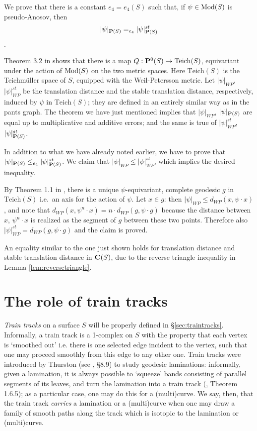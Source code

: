 \begin{rmk}\label{rmk:stable_dist_pc}
We prove that there is a constant $e_4=e_4(S)$ such that, if $\psi\in\mathrm{Mod}(S)$ is pseudo-Anosov, then
$$|\psi|_{\mathbf P(S)}=_{e_4} |\psi|_{\mathbf P(S)}^{st}$$.

Theorem 3.2 in \cite{brock1} shows that there is a map $Q:\mathbf P^0(S)\rightarrow \mathrm{Teich}(S)$, equivariant under the action of $\mathrm{Mod}(S)$ on the two metric spaces. Here $\mathrm{Teich}(S)$ is the Teichm\"uller space of $S$, equipped with the Weil-Petersson metric. Let $|\psi|_{WP}$, $|\psi|_{WP}^{st}$ be the translation distance and the stable translation distance, respectively, induced by $\psi$ in $\mathrm{Teich}(S)$; they are defined in an entirely similar way as in the pants graph. The theorem we have just mentioned implies that $|\psi|_{WP}$, $|\psi|_{\mathbf P(S)}$ are equal up to multiplicative and additive errors; and the same is true of $|\psi|_{WP}^{st}$, $|\psi|_{\mathbf P(S)}^{st}$.

In addition to what we have already noted earlier, we have to prove that $|\psi|_{\mathbf P(S)}\leq_{e_4} |\psi|_{\mathbf P(S)}^{st}$. We claim that $|\psi|_{WP}\leq |\psi|_{WP}^{st}$, which implies the desired inequality.

By Theorem 1.1 in \cite{daskalopoulos}, there is a unique $\psi$-equivariant, complete geodesic $g$ in $\mathrm{Teich}(S)$ i.e.\ an axis for the action of $\psi$. Let $x\in g$: then $|\psi|_{WP}\leq d_{WP}(x,\psi\cdot x)$, and note that $d_{WP}(x,\psi^n\cdot x)=n\cdot d_{WP}(g,\psi\cdot g)$ because the distance between $x$, $\psi^n\cdot x$ is realized as the segment of $g$ between these two points. Therefore also $|\psi|_{WP}^{st}=d_{WP}(g,\psi\cdot g)$ and the claim is proved.

An equality similar to the one just shown holds for translation distance and stable translation distance in $\mathbf C(S)$, due to the reverse triangle inequality in Lemma \ref{lem:reversetriangle}.
\end{rmk}

\section{The role of train tracks}\label{sec:role_train_tracks}

\emph{Train tracks} on a surface $S$ will be properly defined in \S \ref{sec:traintracks}. Informally, a train track is a 1-complex on $S$ with the property that each vertex is `smoothed out' i.e. there is one selected edge incident to the vertex, such that one may proceed smoothly from this edge to any other one. Train tracks were introduced by Thurston (see \cite{thurstonnotes}, \S 8.9) to study geodesic laminations: informally, given a lamination, it is always possible to `squeeze' bands consisting of parallel segments of its leaves, and turn the lamination into a train track (\cite{penner}, Theorem 1.6.5);  as a particular case, one may do this for a (multi)curve. We say, then, that the train track \emph{carries} a lamination or a (multi)curve when one may draw a family of smooth paths along the track which is isotopic to the lamination or (multi)curve.

